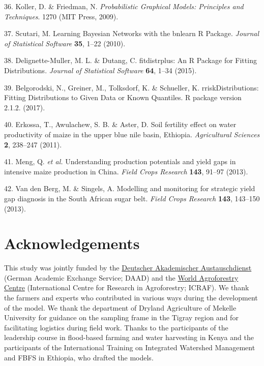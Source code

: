 \documentclass[]{elsarticle} %
\begin{document}
\leavevmode\hypertarget{ref-Koller_and_Friedman_2009}{}%
36. Koller, D. \& Friedman, N. \emph{Probabilistic Graphical Models: Principles and Techniques}. 1270 (MIT Press, 2009).

\leavevmode\hypertarget{ref-Scutari_2010}{}%
37. Scutari, M. Learning Bayesian Networks with the bnlearn R Package. \emph{Journal of Statistical Software} \textbf{35}, 1--22 (2010).

\leavevmode\hypertarget{ref-Delignette-Muller_and_Dutang_2015}{}%
38. Delignette-Muller, M. L. \& Dutang, C. fitdistrplus: An R Package for Fitting Distributions. \emph{Journal of Statistical Software} \textbf{64}, 1--34 (2015).

\leavevmode\hypertarget{ref-Belgorodski_et_al_2017}{}%
39. Belgorodski, N., Greiner, M., Tolksdorf, K. \& Schueller, K. rriskDistributions: Fitting Distributions to Given Data or Known Quantiles. R package version 2.1.2. (2017).

\leavevmode\hypertarget{ref-Erkossa_et_al_2011}{}%
40. Erkossa, T., Awulachew, S. B. \& Aster, D. Soil fertility effect on water productivity of maize in the upper blue nile basin, Ethiopia. \emph{Agricultural Sciences} \textbf{2}, 238--247 (2011).

\leavevmode\hypertarget{ref-Meng_et_al_2013}{}%
41. Meng, Q. \emph{et al.} Understanding production potentials and yield gaps in intensive maize production in China. \emph{Field Crops Research} \textbf{143}, 91--97 (2013).

\leavevmode\hypertarget{ref-VandenBerg_and_Singels_2013}{}%
42. Van den Berg, M. \& Singels, A. Modelling and monitoring for strategic yield gap diagnosis in the South African sugar belt. \emph{Field Crops Research} \textbf{143}, 143--150 (2013).

\hypertarget{acknowledgements}{%
\section*{Acknowledgements}\label{acknowledgements}}

This study was jointly funded by the \href{https://www.daad.de/en/}{Deutscher Akademischer Austauschdienst} (German Academic Exchange Service; DAAD) and the \href{http://www.worldagroforestry.org/}{World Agroforestry Centre} (International Centre for Research in Agroforestry; ICRAF). We thank the farmers and experts who contributed in various ways during the development of the model. We thank the department of Dryland Agriculture of Mekelle University for guidance on the sampling frame in the Tigray region and for facilitating logistics during field work. Thanks to the participants of the leadership course in flood-based farming and water harvesting in Kenya and the participants of the International Training on Integrated Watershed Management and FBFS in Ethiopia, who drafted the models.
\end{document}

